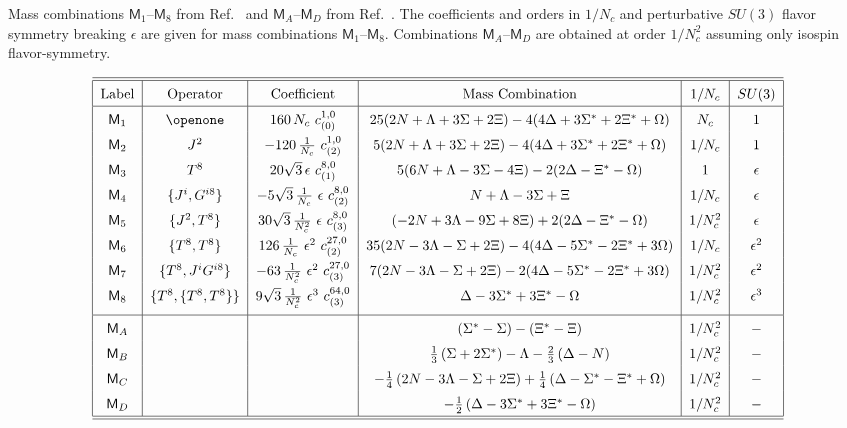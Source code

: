 \documentclass[twocolumn,nofootinbib,prd,aps,superscriptaddress,tightenlines]{revtex4}
\def\mreln{ \mathsf{M} }
\def\N{N_c}
\begin{document}
\begin{table*}
\caption{Mass combinations $\mreln_1$--$\mreln_8$ from Ref.~\cite{jl} and $\mreln_A$--$\mreln_D$ from Ref.~\cite{djm1}.  The coefficients and orders in $1/\N$ and perturbative $SU(3)$ flavor
symmetry breaking $\epsilon$ are given for mass combinations $\mreln_1$--$\mreln_8$.  Combinations $\mreln_A$--$\mreln_D$ are obtained at order $1/N_c^2$ assuming only isospin flavor-symmetry. \label{table:relns}}
\begin{eqnarray*}
\renewcommand\arraystretch{1.5}
\setlength\arraycolsep{0.2cm}
\begin{array}{|c|c|c|c|c|c|}
\hline \hline
\text{Label} & \text{Operator} & \text{Coefficient} & \text{Mass\  Combination}  & 1/\N & SU(3) \\
\hline
 \mreln_1 & \openone &160\, \N \ c^{1,0}_{(0)} & 25(2N +\Lambda+3\Sigma+2\Xi) 
 	-4(4\Delta +3\Sigma^* +2\Xi^* +\Omega) & \N
& 1 \\
%
\mreln_2 & J^2 &-120\, \frac{1}{\N} \ c^{1,0}_{(2)} & 5(2N +\Lambda+3\Sigma+2\Xi) 
	-4(4\Delta +3\Sigma^* +2\Xi^* +\Omega)& 1/\N & 1 \\
%
\mreln_3 & T^8 & 20 \sqrt{3}\, \epsilon \ c^{8,0}_{(1)} & 5(6N +\Lambda-3\Sigma -4\Xi) 
	-2(2\Delta -\Xi^* -\Omega)& 1 & \epsilon \\
%
\mreln_4 & \{ J^i, G^{i8} \} & -5 \sqrt{3}\, \frac{1}{\N}\ \epsilon \ c^{8,0}_{(2)} & N +\Lambda -3\Sigma +\Xi & 1/\N & \epsilon \\
%
\mreln_5 & \{ J^2, T^8 \} &30 \sqrt{3}\, \frac{1}{\N^2}\ \epsilon \ c^{8,0}_{(3)} &(-2N +3\Lambda-9\Sigma + 8\Xi) 
	+2(2\Delta -\Xi^* -\Omega) & 1/\N^2 & \epsilon \\
%
\mreln_6 & \{ T^8, T^8 \} & 126\, \frac{1}{\N} \ \epsilon^2 \ c^{27,0}_{(2)} & 35(2N -3\Lambda-\Sigma+2\Xi) 
	-4(4\Delta -5\Sigma^* -2\Xi^* +3\Omega) & 1/\N & 
 \epsilon^2 \\
%
\mreln_7 & \{T^8, J^i G^{i8} \} & -63\,\frac{1}{\N^2} \ \epsilon^2 \ c^{27,0}_{(3)} & 7(2N -3\Lambda-\Sigma+ 2\Xi) 
	-2(4\Delta -5\Sigma^* -2\Xi^* +3\Omega) &
1/\N^2 & \epsilon^2 \\
%
\mreln_8 & \{ T^8, \{ T^8, T^8 \} \} & 9 \sqrt{3}\,\frac{1}{\N^2} \ \epsilon^3 \ c^{64,0}_{(3)} & \Delta - 3 \Sigma^* + 3 \Xi^* - \Omega & 1/\N^2 & \epsilon^3 \\[5pt]
\hline
\mreln_A &  &  & \left( \Sigma^*  - \Sigma \right)- \left( \Xi^*  - \Xi \right)   & 
1/\N^2 & - \\
\mreln_B &  &  &  {1 \over 3} \left( \Sigma + 2 \Sigma^* \right) - \Lambda - {2 \over 3} \left( \Delta - N \right)  & 1/\N^2 & - \\
\mreln_C &  &  & -{1 \over 4} \left( 2 N - 3  \Lambda -  \Sigma +2 \Xi \right)  +{1 \over 4} \left( \Delta -\Sigma^* - \Xi^* + \Omega \right)  & 1/\N^2 & - \\
\mreln_D &  &  &  -{1 \over 2} \left( \Delta - 3  \Sigma^* +3  \Xi^*-  \Omega \right)  & 1/\N^2 & - \\
\hline\hline
\end{array}
\end{eqnarray*}
\end{table*}
\end{document}
